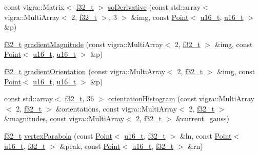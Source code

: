 \begin{DoxyCompactItemize}
\item 
const vigra\+::\+Matrix$<$ \hyperlink{types_8hpp_a37279f6a792de218cef11dff445d532a}{f32\+\_\+t} $>$ \hyperlink{namespacesift_1_1alg_a9c327156119ec4e9fed336819307b84f}{so\+Derivative} (const std\+::array$<$ vigra\+::\+Multi\+Array$<$ 2, \hyperlink{types_8hpp_a37279f6a792de218cef11dff445d532a}{f32\+\_\+t} $>$, 3 $>$ \&img, const \hyperlink{classsift_1_1Point}{Point}$<$ \hyperlink{types_8hpp_a4f53bd979bf45b1ce27e5f43e3a0d33b}{u16\+\_\+t}, \hyperlink{types_8hpp_a4f53bd979bf45b1ce27e5f43e3a0d33b}{u16\+\_\+t} $>$ \&p)
\item 
\hyperlink{types_8hpp_a37279f6a792de218cef11dff445d532a}{f32\+\_\+t} \hyperlink{namespacesift_1_1alg_a87c1723a4c446bfc976bead4c9d56f39}{gradient\+Magnitude} (const vigra\+::\+Multi\+Array$<$ 2, \hyperlink{types_8hpp_a37279f6a792de218cef11dff445d532a}{f32\+\_\+t} $>$ \&img, const \hyperlink{classsift_1_1Point}{Point}$<$ \hyperlink{types_8hpp_a4f53bd979bf45b1ce27e5f43e3a0d33b}{u16\+\_\+t}, \hyperlink{types_8hpp_a4f53bd979bf45b1ce27e5f43e3a0d33b}{u16\+\_\+t} $>$ \&p)
\item 
\hyperlink{types_8hpp_a37279f6a792de218cef11dff445d532a}{f32\+\_\+t} \hyperlink{namespacesift_1_1alg_afa9180c1103e4d0963b01959e23f14e9}{gradient\+Orientation} (const vigra\+::\+Multi\+Array$<$ 2, \hyperlink{types_8hpp_a37279f6a792de218cef11dff445d532a}{f32\+\_\+t} $>$ \&img, const \hyperlink{classsift_1_1Point}{Point}$<$ \hyperlink{types_8hpp_a4f53bd979bf45b1ce27e5f43e3a0d33b}{u16\+\_\+t}, \hyperlink{types_8hpp_a4f53bd979bf45b1ce27e5f43e3a0d33b}{u16\+\_\+t} $>$ \&p)
\item 
const std\+::array$<$ \hyperlink{types_8hpp_a37279f6a792de218cef11dff445d532a}{f32\+\_\+t}, 36 $>$ \hyperlink{namespacesift_1_1alg_a7e02858b24fa453d0866b2ae2910ad31}{orientation\+Histogram} (const vigra\+::\+Multi\+Array$<$ 2, \hyperlink{types_8hpp_a37279f6a792de218cef11dff445d532a}{f32\+\_\+t} $>$ \&orientations, const vigra\+::\+Multi\+Array$<$ 2, \hyperlink{types_8hpp_a37279f6a792de218cef11dff445d532a}{f32\+\_\+t} $>$ \&magnitudes, const vigra\+::\+Multi\+Array$<$ 2, \hyperlink{types_8hpp_a37279f6a792de218cef11dff445d532a}{f32\+\_\+t} $>$ \&current\+\_\+gauss)
\item 
\hyperlink{types_8hpp_a37279f6a792de218cef11dff445d532a}{f32\+\_\+t} \hyperlink{namespacesift_1_1alg_ad087a900110dfb1e70e5f9f2c76234f2}{vertex\+Parabola} (const \hyperlink{classsift_1_1Point}{Point}$<$ \hyperlink{types_8hpp_a4f53bd979bf45b1ce27e5f43e3a0d33b}{u16\+\_\+t}, \hyperlink{types_8hpp_a37279f6a792de218cef11dff445d532a}{f32\+\_\+t} $>$ \&ln, const \hyperlink{classsift_1_1Point}{Point}$<$ \hyperlink{types_8hpp_a4f53bd979bf45b1ce27e5f43e3a0d33b}{u16\+\_\+t}, \hyperlink{types_8hpp_a37279f6a792de218cef11dff445d532a}{f32\+\_\+t} $>$ \&peak, const \hyperlink{classsift_1_1Point}{Point}$<$ \hyperlink{types_8hpp_a4f53bd979bf45b1ce27e5f43e3a0d33b}{u16\+\_\+t}, \hyperlink{types_8hpp_a37279f6a792de218cef11dff445d532a}{f32\+\_\+t} $>$ \&rn)
\end{DoxyCompactItemize}


